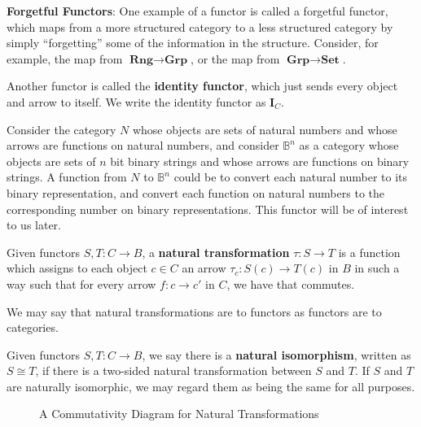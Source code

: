 \documentclass[14pt]{extarticle}  %
\begin{document}
\begin{ex} \textbf{Forgetful Functors}: One example of a functor is called a forgetful functor, which maps from a more structured category to a less structured
  category by simply ``forgetting'' some of the information in the structure. Consider, for example, the map from $\textbf{Rng} \to \textbf{Grp}$, or the map from $\textbf{Grp}\to\textbf{Set}$.

  Another functor is called the \textbf{identity functor}, which just sends every object and arrow to itself. We write the identity functor as $\textbf{I}_{C}$.
\end{ex}

\begin{ex}
  Consider the category $N$ whose objects are sets of natural numbers and whose arrows are functions on natural numbers, and consider $\mathbb{B}^{n}$ as a category whose objects
  are sets of $n$ bit binary strings and whose arrows are functions on binary strings. A function from $N$ to $\mathbb{B}^{n}$ could be to convert each natural number to its binary representation,
  and convert each function on natural numbers to the corresponding number on binary representations. This functor will be of interest to us later.
\end{ex}

\begin{defn}
  Given functors $S,T : C \to B$, a \textbf{natural transformation} $\tau : S \to T$ is a function which assigns to each object $c \in C$ an arrow $\tau_{c} : S(c) \to T(c)$ in $B$ in such a way such that
  for every arrow $f : c \to c'$ in $C$, we have that  commutes.
\end{defn}
We may say that natural transformations are to functors as functors are to categories.

\begin{defn}
  Given functors $S,T : C \to B$, we say there is a \textbf{natural isomorphism}, written as $S \cong T$, if there is a two-sided natural transformation between $S$ and $T$.
  If $S$ and $T$ are naturally isomorphic, we may regard them as being the same for all purposes.
\end{defn}
\begin{figure}[!h]
\centering
\caption{A Commutativity Diagram for Natural Transformations}
\label{fig:nattrans}
\end{figure}
\end{document}
